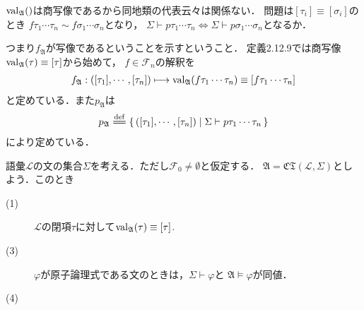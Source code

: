 	\begin{screen}
		\begin{thm}[定義2.12.9の正当性の検証]
			$\operatorname{val}_{\mathfrak{A}}()$は商写像であるから同地類の代表云々は関係ない．
			問題は$[\tau_{i}] \equiv [\sigma_{i}]$のとき
			$f\tau_{1}\cdots\tau_{n} \sim f\sigma_{1}\cdots\sigma_{n}$となり，
			$\Sigma \vdash p\tau_{1}\cdots\tau_{n} \Longleftrightarrow 
			\Sigma \vdash p\sigma_{1}\cdots\sigma_{n}$となるか．
		\end{thm}
	\end{screen}
	
	つまり$f_{\mathfrak{A}}$が写像であるということを示すということ．
	定義2.12.9では商写像$\operatorname{val}_{\mathfrak{A}}(\tau) \equiv [\tau]$から始めて，
	$f \in \mathcal{F}_{n}$の解釈を
	\begin{align}
		f_{\mathfrak{A}}:
		([\tau_{1}],\cdots,[\tau_{n}]) \longmapsto
		\operatorname{val}_{\mathfrak{A}}(f\tau_{1}\cdots\tau_{n})
		\equiv [f\tau_{1}\cdots\tau_{n}]
	\end{align}
	と定めている．また$p_{\mathfrak{A}}$は
	\begin{align}
		p_{\mathfrak{A}} \defeq \Set{([\tau_{1}],\cdots,[\tau_{n}])}{
		\Sigma \vdash p\tau_{1}\cdots\tau_{n}}
	\end{align}
	により定めている．
	
	\begin{screen}
		\begin{thm}[補題2.12.10]
			語彙$\mathcal{L}$の文の集合$\Sigma$を考える．ただし$\mathcal{F}_{0} \neq \emptyset$と仮定する．
			$\mathfrak{A} = \mathfrak{CT}(\mathcal{L},\Sigma)$としよう．このとき
			\begin{description}
				\item[(1)] $\mathcal{L}$の閉項$\tau$に対して$\operatorname{val}_{\mathfrak{A}}(\tau) \equiv [\tau]$.
				\item[(3)] $\varphi$が原子論理式である文のときは，$\Sigma \vdash \varphi$と
					$\mathfrak{A} \models \varphi$が同値．
				\item[(4)] 
			\end{description}
		\end{thm}
	\end{screen}
	
